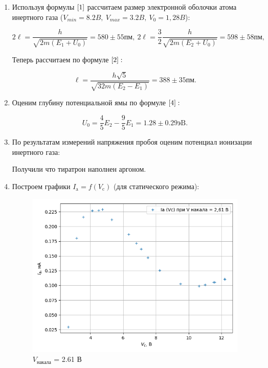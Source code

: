 \documentclass[a4paper, 12pt]{article}%
\begin{document}
\begin{enumerate}

\item Используя формулы $\ref{1}$ рассчитаем размер электронной оболочки атома инертного газа ($V_{min} = 8.2 B,\ V_{max} = 3.2 B,\ V_0 = 1,28 B$):

\begin{equation*}
2\ell = \dfrac{h}{\sqrt{2m(E_1 + U_0)}} = 580 \pm 55 \text{пм},~2\ell = \dfrac{3}{2}\dfrac{h}{\sqrt{2m(E_2 + U_0)}} = 598 \pm 58 \text{пм},
\end{equation*}

Теперь рассчитаем по формуле $\ref{2}:$

\begin{equation*}
\ell = \dfrac{h\sqrt{5}}{\sqrt{32m(E_2 - E_1)}} = 388 \pm 35 \text{пм}.
\end{equation*}

\item Оценим глубину потенциальной ямы по формуле $\ref{4}:$

\begin{equation*}
U_0 = \dfrac{4}{5}E_2 - \dfrac{9}{5}E_1 = 1.28 \pm 0.29\text{эB}.
\end{equation*}

\item По результатам измерений напряжения пробоя оценим потенциал ионизации инертного газа:

Получили что тиратрон наполнен аргоном.

\item Построем графики $I_{\mathrm{a}}=f\left(V_{\mathrm{c}}\right)$ (для статического режима):


\begin{figure}[!h]
\includegraphics[scale=0.6]{I_V_static_261.png}
\centering
\caption{$V_{\text{накала}}$ = 2.61 В}
\label{graph1}
\end{figure}


\end{enumerate}
\end{document}
